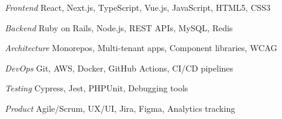 \begin{minipage}[t]{0.55\textwidth}
\begin{cvskills}



 \cvskill
    {\textit{Frontend}} %
    {React, Next.js, TypeScript, Vue.js, JavaScript, HTML5, CSS3} %


  \cvskill
    {\textit{Backend}} %
    {Ruby on Rails, Node.js, REST APIs, MySQL, Redis} %


  \cvskill
    {\textit{Architecture}} %
    {Monorepos, Multi-tenant apps, Component libraries, WCAG} %

 
\end{cvskills}
\end{minipage}%
\begin{minipage}[t]{0.45\textwidth}
\begin{cvskills}

  \cvskill
    {\textit{DevOps}} %
    {Git, AWS, Docker, GitHub Actions, CI/CD pipelines} %


  \cvskill
    {\textit{Testing}} %
    {Cypress, Jest, PHPUnit, Debugging tools} %


  \cvskill
    {\textit{Product}} %
    {Agile/Scrum, UX/UI, Jira, Figma, Analytics tracking} %

\end{cvskills}
\end{minipage}

%

%